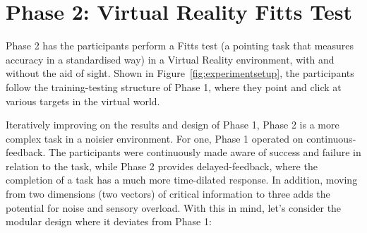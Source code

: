 \documentclass[
hidelinks,
12pt, %
oneside, %
english, %
doublespacing, %
headsepline, %
]{MastersDoctoralThesis} %
\begin{document}
\section{Phase 2: Virtual Reality Fitts Test}

Phase 2 has the participants perform a Fitts test (a pointing task that measures accuracy in a standardised way) in a Virtual Reality environment, with and without the aid of sight.
Shown in Figure~\ref{fig:experimentsetup}, the participants follow the training-testing structure of Phase 1, where they point and click at various targets in the virtual world.

Iteratively improving on the results and design of Phase 1, Phase 2 is a more complex task in a noisier environment. For one, Phase 1 operated on continuous-feedback. The participants were continuously made aware of success and failure in relation to the task, while Phase 2 provides delayed-feedback, where the completion of a task has a much more time-dilated response. In addition, moving from two dimensions (two vectors) of critical information to three adds the potential for noise and sensory overload. With this in mind, let's consider the modular design where it deviates from Phase 1:
\end{document}
